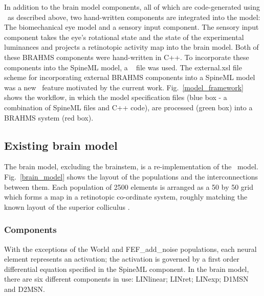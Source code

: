 \documentclass{frontiersSCNS}
\begin{document}
In addition to the brain model components, all of which are
code-generated using \stob~as described above, two hand-written
components are integrated into the model: The biomechanical eye model
and a sensory input component. The sensory input component takes the
eye's rotational state and the state of the experimental luminances
and projects a retinotopic activity map into the brain model. Both of
these BRAHMS components were hand-written in C++. To incorporate these
components into the SpineML model, a \stob~ file was
used.  The external.xsl file scheme for incorporating external BRAHMS
components into a SpineML model was a new \stob~feature motivated by
the current work.  Fig.~\ref{model_framework} shows the workflow, in
which the model specification files (blue box - a combination of
SpineML files and C++ code), are processed (green box) into a BRAHMS
system (red box).

\subsection{Existing brain model}

The brain model, excluding the brainstem, is a re-implementation of
the \ccg~model. Fig.~\ref{brain_model} shows the layout of the
populations and the interconnections between them. Each population of
2500 elements is arranged as a 50 by 50 grid which forms a map in a
retinotopic co-ordinate system, roughly matching the known layout of
the superior colliculus \citep{robinson_eye_1972}.

\subsubsection{Components}

With the exceptions of the World and FEF\_add\_noise populations, each
neural element represents an activation; the activation is governed by
a first order differential equation specified in the SpineML
component. In the brain model, there are six different components in
use: LINlinear; LINret; LINexp; D1MSN and D2MSN.
\end{document}
